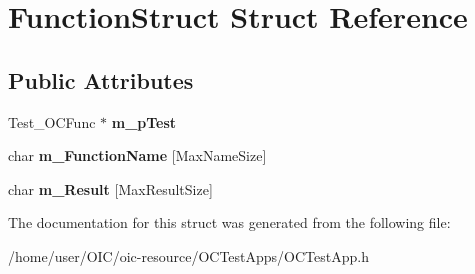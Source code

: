 \hypertarget{structFunctionStruct}{}\section{Function\+Struct Struct Reference}
\label{structFunctionStruct}
\subsection*{Public Attributes}
\begin{DoxyCompactItemize}
\item 
\hypertarget{structFunctionStruct_a4f097d064aed11225d2a8e108cff0e96}{}Test\+\_\+\+O\+C\+Func $\ast$ {\bfseries m\+\_\+p\+Test}\label{structFunctionStruct_a4f097d064aed11225d2a8e108cff0e96}

\item 
\hypertarget{structFunctionStruct_a75d77be59f0663a3e47dddd641bf924b}{}char {\bfseries m\+\_\+\+Function\+Name} \mbox{[}Max\+Name\+Size\mbox{]}\label{structFunctionStruct_a75d77be59f0663a3e47dddd641bf924b}

\item 
\hypertarget{structFunctionStruct_acd34b4fda37639618fa5326e6bcd99bb}{}char {\bfseries m\+\_\+\+Result} \mbox{[}Max\+Result\+Size\mbox{]}\label{structFunctionStruct_acd34b4fda37639618fa5326e6bcd99bb}

\end{DoxyCompactItemize}


The documentation for this struct was generated from the following file\+:\begin{DoxyCompactItemize}
\item 
/home/user/\+O\+I\+C/oic-\/resource/\+O\+C\+Test\+Apps/O\+C\+Test\+App.\+h\end{DoxyCompactItemize}
